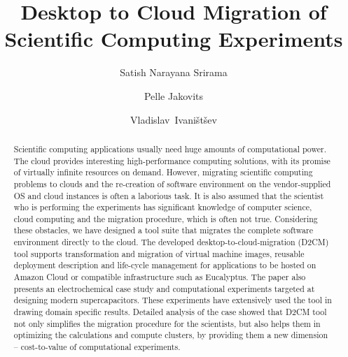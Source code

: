 \documentclass[a4paper,10pt]{article}
\begin{document}
\title{Desktop to Cloud Migration of Scientific Computing Experiments}

\author[1]{Satish Narayana Srirama}
\author[1]{Pelle Jakovits}
\author[2]{Vladislav~Ivani{\v s}t{\v s}ev}
\renewcommand\Authands{ and }







\maketitle

\begin{abstract}




Scientific computing applications usually need huge amounts of computational power. The cloud provides interesting high-performance computing solutions, with its promise of virtually infinite resources on demand. However, migrating scientific computing problems to clouds and the re-creation of software environment on the vendor-supplied OS and cloud instances is often a laborious task. It is also assumed that the scientist who is performing the experiments has significant knowledge of computer science, cloud computing and the migration procedure, which is often not true. Considering these obstacles, we have designed a tool suite that migrates the complete software environment directly to the cloud. The developed desktop-to-cloud-migration (D2CM) tool supports transformation and migration of virtual machine images, reusable deployment description and life-cycle management for applications to be hosted on Amazon Cloud or compatible infrastructure such as Eucalyptus. The paper also presents an electrochemical case study and computational experiments targeted at designing modern supercapacitors. These experiments have extensively used the tool in drawing domain specific results. Detailed analysis of the case showed that D2CM tool not only simplifies the migration procedure for the scientists, but also helps them in optimizing the calculations and compute clusters, by providing them a new dimension -- cost-to-value of computational experiments.

\end{abstract}
\end{document}
